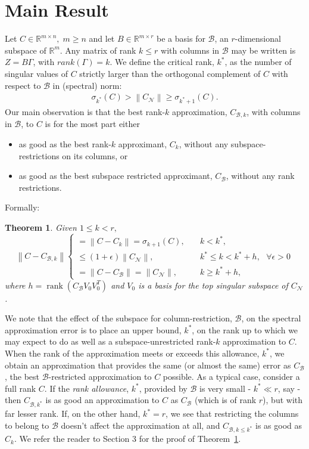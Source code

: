 \documentclass[11pt]{article}
\newcommand{\rank}{\operatorname{rank}}
\newtheorem{theorem}{Theorem}
\renewcommand{\math}[1]{$#1$}
\def\reals{\mathbb{R}}
\newcommand{\norm}[1]{\left\|#1\right\|}
\newcommand{\B}{\mathcal{B}}
\newcommand{\N}{\mathcal{N}}
\newcommand{\G}{\Gamma}
\newcommand{\0}{\ensuremath{\mathbf{0}}}
\renewcommand{\>}{\succ}
\newcommand{\<}{\prec}
\begin{document}
\section{Main Result}
Let $C \in \reals^{m \times n}, \; m \geq n$ and let $B \in \reals^{m \times r}$ be a basis for $\B$, an $r$-dimensional subspace of $\reals^m$. Any matrix of rank $k \leq r$ with columns in $\B$ may be written is $Z = B \G$, with $rank(\G) = k$. We define the critical rank, $k^*$, as the number of singular values of $C$ strictly larger than the orthogonal complement of $C$ with respect to $\B$ in (spectral) norm:
\begin{eqnarray}\label{critical rank inequality}
\sigma_{k^*}(C) > \norm{C_{\N}} \geq \sigma_{k^*+1}(C).
\end{eqnarray}
Our main observation is that the best rank-$k$ approximation, $C_{\B, k}$, with columns in $\B$, to $C$ is for the most part either
\begin{itemize}
\item as good as the best rank-$k$ approximant, $C_k$, without any subspace-restrictions on its columns, or
\item as good as the best subspace restricted approximant, $C_{\B}$, without any rank restrictions.
\end{itemize}
Formally:
\begin{theorem}\label{main theorem}
Given $1 \leq k < r,$
\[ \norm{C - C_{\B,k}}  \left\{ \begin{array}{ll} = \norm{C - C_k} = \sigma_{k+1}(C), & \quad k < k^*,\\
[5 pt] \leq (1+\epsilon)\norm{C_{\N}}, & \quad k^* \leq k < k^*+h, \text{ } \forall \epsilon > 0 \\
[5 pt] = \norm{C - C_{\B}} = \norm{C_{\N}}, & \quad k \geq k^*+h,  \end{array} \right. \]
where $h=\rank(C_{\B} V_0V_0^T)$ 
and \math{V_0} is a basis for the top singular subspace of $C_{\N}$.
\end{theorem}

\noindent We note that the effect of the subspace for column-restriction, $\B$, on the spectral approximation error is to place an upper bound, $k^*$, on the rank up to which we may expect to do as well as a subspace-unrestricted rank-$k$ approximation to $C$. When the rank of the approximation meets or exceeds this allowance, $k^*$, we obtain an approximation that provides the same (or almost the same) error as $C_{\B}$, the best $\B$-restricted approximation to $C$ possible. As a typical case, consider a full rank $C$. If the \emph{rank allowance}, $k^*$, provided by $\B$ is very small - $k^* \ll r$, say - then $C_{\B,  k^*}$ is as good an approximation to $C$ as $C_{\B}$ (which is of rank $r$), but with far lesser rank. If, on the other hand, $k^* = r$, we see that restricting the columns to belong to $\B$ doesn't affect the approximation at all, and $C_{\B, k \leq k^*}$ is as good as $C_k$. We refer the reader to Section 3 for the proof of Theorem~\ref{main theorem}. 
\end{document}
